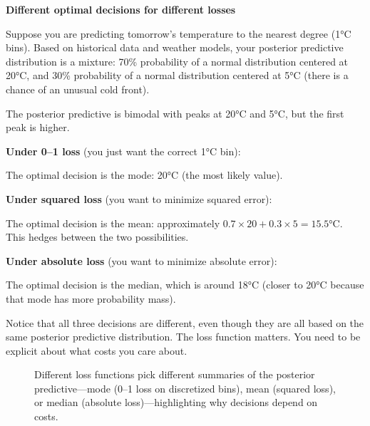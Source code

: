 \begin{examplebox}
\textbf{Different optimal decisions for different losses}

\vspace{0.5em}

Suppose you are predicting tomorrow's temperature to the nearest degree (1°C bins). Based on historical data and weather models, your posterior predictive distribution is a mixture: 70\% probability of a normal distribution centered at 20°C, and 30\% probability of a normal distribution centered at 5°C (there is a chance of an unusual cold front).

\vspace{0.5em}

The posterior predictive is bimodal with peaks at 20°C and 5°C, but the first peak is higher.

\vspace{0.5em}

\textbf{Under 0--1 loss} (you just want the correct 1°C bin):

The optimal decision is the mode: 20°C (the most likely value).

\vspace{0.5em}

\textbf{Under squared loss} (you want to minimize squared error):

The optimal decision is the mean: approximately $0.7 \times 20 + 0.3 \times 5 = 15.5$°C. This hedges between the two possibilities.

\vspace{0.5em}

\textbf{Under absolute loss} (you want to minimize absolute error):

The optimal decision is the median, which is around 18°C (closer to 20°C because that mode has more probability mass).

\vspace{0.5em}

Notice that all three decisions are different, even though they are all based on the same posterior predictive distribution. The loss function matters. You need to be explicit about what costs you care about.
\end{examplebox}

\begin{figure}[t]
\centering

\caption{Different loss functions pick different summaries of the posterior predictive---mode (0--1 loss on discretized bins), mean (squared loss), or median (absolute loss)---highlighting why decisions depend on costs.}
\label{fig:loss_decisions}
\end{figure}

